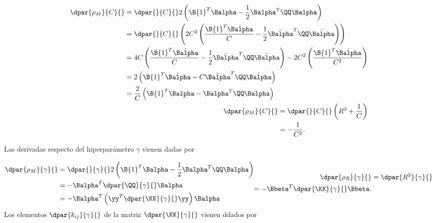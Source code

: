 \begin{align}
  \begin{aligned}
    \dpar{\rho_M}{C}{}
    &= \dpar{}{C}{}2\left(  \B{1}^T\Balpha-\frac{1}{2}\Balpha^T\QQ\Balpha \right) \\
    &= \dpar{}{C}{}\left( 2C^2\left(\frac{\B{1}^T\bar{\Balpha}}{C} -
    \frac{1}{2}\bar{\Balpha}^T\QQ\bar{\Balpha}\right)
    \right) \\
    &= 4C \left(\frac{\B{1}^T\bar{\Balpha}}{C} -
    \frac{1}{2}\bar{\Balpha}^T\QQ\bar{\Balpha}\right) - 2C^2 \left(\frac{\B{1}^T\bar{\Balpha}}{C^2} \right) \\
    &= 2\left(\B{1}^T\bar{\Balpha} - C \bar{\Balpha}^T\QQ\bar{\Balpha}\right) \\
    &= \frac{2}{C} \left(\B{1}^T\Balpha - \Balpha^T\QQ\Balpha\right)
  \end{aligned}
  \\
  \begin{aligned}
    \dpar{\rho_M}{C}{}
    &= \dpar{}{C}{} \left( R^2 + \frac{1}{C} \right) \\
    &= -\frac{1}{C^2}.
  \end{aligned}
\end{align}

Las derivadas respecto del hiperparámetro $\gamma$ vienen dadas por

\begin{align}
  \begin{aligned}
    \dpar{\rho_M}{\gamma}{}
    &= \dpar{}{\gamma}{} 2\left(  \B{1}^T\Balpha-\frac{1}{2}\Balpha^T\QQ\Balpha \right) \\
    &= - \Balpha^T \dpar{\QQ}{\gamma}{}\Balpha \\
    & = - \Balpha^T \left(\yy^T \dpar{\KK}{\gamma}{}\yy\right) \Balpha
  \end{aligned}
  \begin{aligned}
    \dpar{\rho_R}{\gamma}{} &= \dpar{R^2}{\gamma}{} \\
    = - \Bbeta^T \dpar{\KK}{\gamma}{} \Bbeta. %
  \end{aligned}
\end{align}
Los elementos $\dpar{k_{ij}}{\gamma}{}$ de la matriz $\dpar{\KK}{\gamma}{}$ 
vienen ddados por

